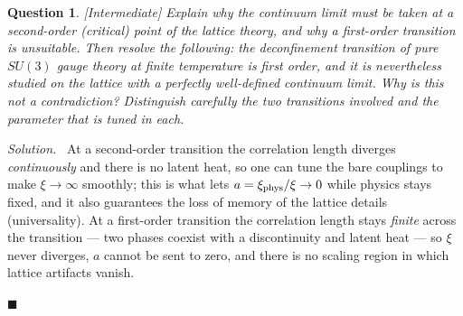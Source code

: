 \documentclass[11pt]{article}
\newcommand{\diff}[1]{\textcolor{blue!60!black}{\footnotesize\textsf{[#1]}}\quad}
\newtheorem{question}{Question}
\newenvironment{solution}{\par\smallskip\noindent\textit{Solution.}\ }{\hfill$\blacksquare$\par\smallskip}
\begin{document}
\begin{question}
\diff{Intermediate} Explain why the continuum limit must be taken at a second-order (critical) point of the lattice theory, and why a first-order transition is unsuitable. Then resolve the following: the deconfinement transition of pure $SU(3)$ gauge theory at finite temperature \emph{is} first order, and it is nevertheless studied on the lattice with a perfectly well-defined continuum limit. Why is this not a contradiction? Distinguish carefully the two transitions involved and the parameter that is tuned in each.
\end{question}
\begin{solution}
At a second-order transition the correlation length diverges \emph{continuously} and there is no latent heat, so one can tune the bare couplings to make $\xi \to \infty$ smoothly; this is what lets $a = \xi_{\rm phys}/\xi \to 0$ while physics stays fixed, and it also guarantees the loss of memory of the lattice details (universality). At a first-order transition the correlation length stays \emph{finite} across the transition --- two phases coexist with a discontinuity and latent heat --- so $\xi$ never diverges, $a$ cannot be sent to zero, and there is no scaling region in which lattice artifacts vanish.


\end{solution}
\end{document}
